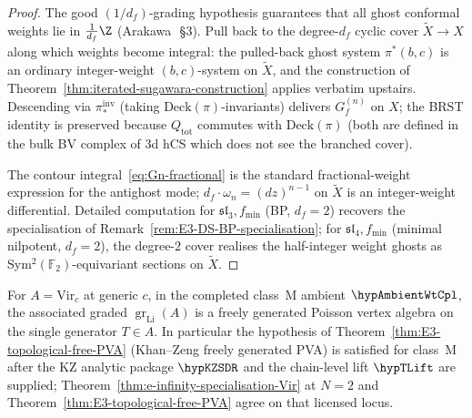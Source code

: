\begin{proof}
The good $(1/d_f)$-grading hypothesis guarantees that all ghost
conformal weights lie in $\tfrac{1}{d_f}\Z$
\textup{(}Arakawa~\cite{Arakawa-W}\,§3\textup{)}. Pull back to the
degree-$d_f$ cyclic cover $\widetilde X \to X$ along which weights
become integral: the pulled-back ghost system $\pi^* (b, c)$ is an
ordinary integer-weight $(b, c)$-system on $\widetilde X$, and the
construction of Theorem~\ref{thm:iterated-sugawara-construction}
applies verbatim upstairs. Descending via $\pi_*^{\mathrm{inv}}$
(taking $\mathrm{Deck}(\pi)$-invariants) delivers $G^{(n)}_f$ on
$X$; the BRST identity is preserved because $Q_{\mathrm{tot}}$
commutes with $\mathrm{Deck}(\pi)$
\textup{(}both are defined in the bulk BV complex of $3$d
hCS which does not see the branched cover\textup{)}.

The contour integral~\eqref{eq:Gn-fractional} is the standard
fractional-weight expression for the antighost mode; $d_f \cdot \omega_n =
(dz)^{n-1}$ on $\widetilde X$ is an integer-weight differential.
Detailed computation for $\mathfrak{sl}_3, f_{\min}$
\textup{(}BP, $d_f = 2$\textup{)} recovers the specialisation of
Remark~\textup{\ref{rem:E3-DS-BP-specialisation}}; for
$\mathfrak{sl}_4, f_{\min}$ (minimal nilpotent, $d_f = 2$), the degree-$2$
cover realises the half-integer weight ghosts as
Sym${}^2(\mathbb{F}_2)$-equivariant sections on $\widetilde X$.
\end{proof}

\begin{proposition}
\label{prop:class-M-free-PVA}
For $A = \mathrm{Vir}_c$ at generic $c$, in the completed class~M
ambient \(\hypAmbientWtCpl\), the associated graded
$\operatorname{gr}_{\mathrm{Li}}(A)$ is a freely generated Poisson vertex
algebra on the single generator $T \in A$. In particular the hypothesis
of Theorem~\textup{\ref{thm:E3-topological-free-PVA}}
\textup{(}Khan--Zeng freely generated PVA\textup{)} is satisfied for
class~M after the KZ analytic package \(\hypKZSDR\) and the
chain-level lift \(\hypTLift\) are supplied; Theorem~\ref{thm:e-infinity-specialisation-Vir}
at $N = 2$ and Theorem~\ref{thm:E3-topological-free-PVA} agree on that
licensed locus.
\end{proposition}

